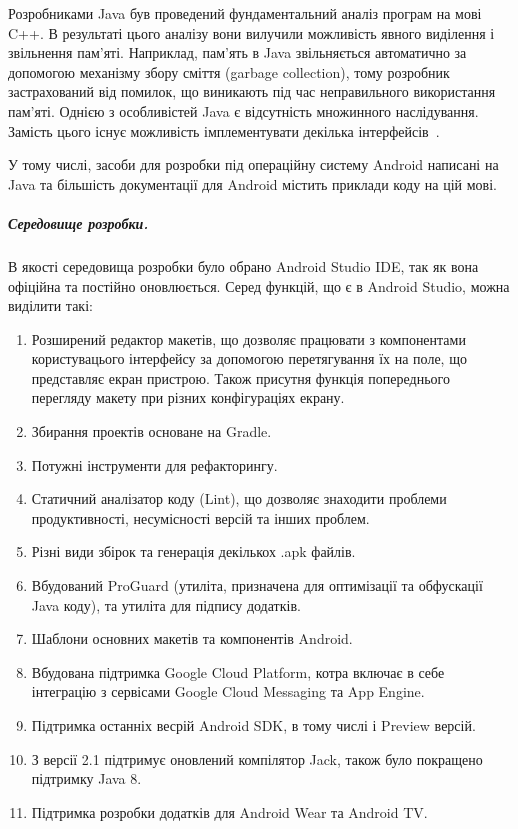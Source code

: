 \documentclass[../main.tex]{subfiles}
\begin{document}
Розробниками Java був проведений фундаментальний аналіз програм на мові C++. В результаті цього аналізу вони вилучили можливість явного виділення і звільнення пам'яті. Наприклад, пам'ять в Java звільняється автоматично за допомогою механізму збору сміття (garbage collection), тому розробник застрахований від помилок, що виникають під час неправильного використання пам'яті. Однією з особливістей Java є відсутність множинного наслідування. Замість цього існує можливість імплементувати декілька інтерфейсів~\cite{thinking_java}.

У тому числі, засоби для розробки під операційну систему Android написані на Java та більшість документації для Android містить приклади коду на цій мові.

\subparagraph{Середовище розробки.}
В якості середовища розробки було обрано Android Studio IDE, так як вона офіційна та постійно оновлюється. Серед функцій, що є в Android Studio, можна виділити такі:

\begin{enumerate}
	\item Розширений редактор макетів, що дозволяє працювати з компонентами користувацього інтерфейсу за допомогою перетягування їх на поле, що представляє екран пристрою. Також присутня функція попереднього перегляду макету при різних конфігураціях екрану.
	\item Збирання проектів основане на Gradle.
	\item Потужні інструменти для рефакторингу.
	\item Статичний аналізатор коду (Lint), що дозволяє знаходити проблеми продуктивності, несумісності версій та інших проблем.
	\item Різні види збірок та генерація декількох .apk файлів.
	\item Вбудований ProGuard (утиліта, призначена для оптимізації та обфускації Java коду), та утиліта для підпису додатків.
	\item Шаблони основних макетів та компонентів Android.
	\item Вбудована підтримка Google Cloud Platform, котра включає в себе інтеграцію з сервісами Google Cloud Messaging та App Engine.
	\item Підтримка останніх весрій Android SDK, в тому числі і Preview версій.
	\item З версії 2.1 підтримує оновлений компілятор Jack, також було покращено підтримку Java 8.
	\item Підтримка розробки додатків для Android Wear та Android TV.
\end{enumerate}
\end{document}
